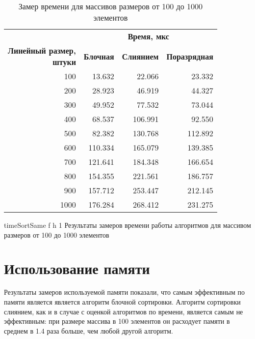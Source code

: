 \begin{table}[ht]
	\small
	\begin{center}
		\begin{threeparttable}
			\caption{Замер времени для массивов размеров от 100 до 1000 элементов}
			\label{tbl:timeSame}
			\begin{tabular}{|r|r|r|r|}
				\hline
				& \multicolumn{3}{c|}{\bfseries Время, мкс} \\ \cline{2-4}
				\bfseries \makecell{Линейный размер, \\ штуки} & \bfseries Блочная & \bfseries Слиянием & \bfseries Поразрядная \\ \cline{2-4}
				\hline
				100 & 13.632 & 22.066 & 23.332 \\
				\hline
				200 & 28.923 & 46.919 & 44.327 \\
				\hline
				300 & 49.952 & 77.532 & 73.044 \\
				\hline
				400 & 68.537 & 106.991 & 92.550 \\
				\hline
				500 & 82.382 & 130.768 & 112.892 \\
				\hline
				600 & 110.334 & 165.079 & 139.385 \\
				\hline
				700 & 121.641 & 184.348 & 166.654 \\
				\hline
				800 & 154.355 & 221.561 & 186.757 \\
				\hline
				900 & 157.712 & 253.447 & 212.145 \\
				\hline
				1000 & 176.284 & 268.412 & 231.275 \\
				\hline
			\end{tabular}	
		\end{threeparttable}
	\end{center}
\end{table}

\clearpage

{timeSortSame} %
{f} %
{h} %
{1\textwidth} %
{Результаты замеров времени работы алгоритмов для массивом размеров от 100 до 1000 элементов} %


\section{Использование памяти}

Результаты замеров используемой памяти показали, что самым эффективным по памяти является является алгоритм блочной сортировки.
Алгоритм сортировки слиянием, как и в случае с оценкой алгоритмов по времени,
является самым не эффективным: при размере массива в 100 элементов он расходует памяти в среднем в 1.4 раза больше, чем любой другой алгоритм. 


